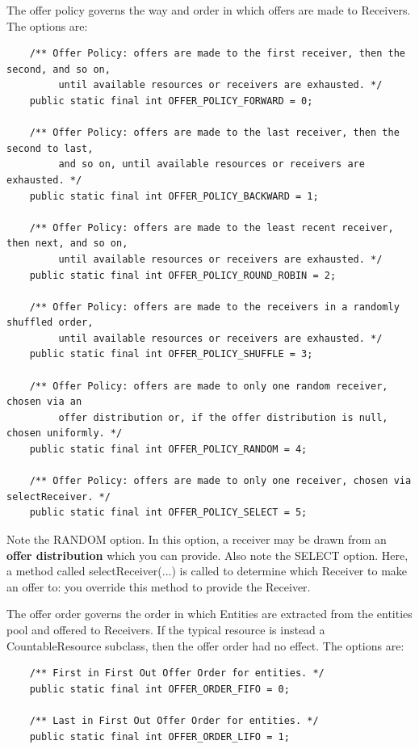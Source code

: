 \documentclass[twoside,10pt]{article}
\begin{document}
The offer policy governs the way and order in which offers are made to Receivers.  The options are:

\begin{verbatim}
    /** Offer Policy: offers are made to the first receiver, then the second, and so on, 
         until available resources or receivers are exhausted. */
    public static final int OFFER_POLICY_FORWARD = 0;
    
    /** Offer Policy: offers are made to the last receiver, then the second to last, 
         and so on, until available resources or receivers are exhausted. */
    public static final int OFFER_POLICY_BACKWARD = 1;
    
    /** Offer Policy: offers are made to the least recent receiver, then next, and so on, 
         until available resources or receivers are exhausted. */
    public static final int OFFER_POLICY_ROUND_ROBIN = 2;
    
    /** Offer Policy: offers are made to the receivers in a randomly shuffled order, 
         until available resources or receivers are exhausted. */
    public static final int OFFER_POLICY_SHUFFLE = 3;
    
    /** Offer Policy: offers are made to only one random receiver, chosen via an 
         offer distribution or, if the offer distribution is null, chosen uniformly. */
    public static final int OFFER_POLICY_RANDOM = 4;
    
    /** Offer Policy: offers are made to only one receiver, chosen via selectReceiver. */
    public static final int OFFER_POLICY_SELECT = 5;
\end{verbatim}

Note the RANDOM option.  In this option, a receiver may be drawn from an {\bf offer distribution} which you can provide.  Also note the SELECT option.  Here, a method called selectReceiver(...) is called to determine which Receiver to make an offer to: you override this method to provide the Receiver.
   
The offer order governs the order in which Entities are extracted from the entities pool and offered to Receivers.  If the typical resource is instead a CountableResource subclass, then the offer order had no effect.  The options are: 
    
\begin{verbatim}
    /** First in First Out Offer Order for entities. */
    public static final int OFFER_ORDER_FIFO = 0;
    
    /** Last in First Out Offer Order for entities. */
    public static final int OFFER_ORDER_LIFO = 1;
\end{verbatim}
\end{document}
